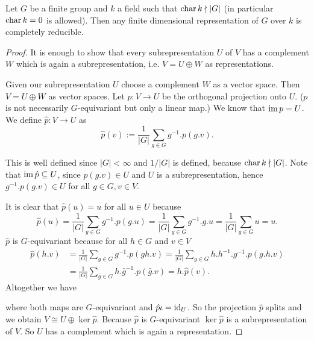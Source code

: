 \begin{thrm}
 Let $G$ be a finite group and $k$ a field such that $\operatorname{char} k \nmid |G|$ (in particular $\operatorname{char} k = 0$ is allowed). Then any finite dimensional representation of $G$ over $k$ is completely reducible.
\end{thrm}
\begin{proof}
 It is enough to show that every subrepresentation $U$ of $V$ has a complement $W$ which is again a subrepresentation, i.e. $V = U \oplus W$ as representations.
 
 Given our subrepresentation $U$ choose a complement $W$ as a vector space. Then $V = U \oplus W$ as vector spaces. Let $p : V \to U$ be the orthogonal projection onto $U$. ($p$ is not necessarily $G$-equivariant but only a linear map.) We know that $\operatorname{im} p = U$. We define $\hat{p} : V \to U$ as
 \[
  \hat{p}(v) := \frac{1}{|G|} \sum_{g \in G} g^{-1}.p(g.v).
 \]

This is well defined since $|G| < \infty$ and $1/|G|$ is defined, because $\operatorname{char} k \nmid |G|$. Note that $\operatorname{im} \hat{p} \subseteq U$, since $p(g.v) \in U$ and $U$ is a subrepresentation, hence $g^{-1}.p(g.v) \in U$ for all $g \in G, v \in V$.

It is clear that $\hat{p}(u) = u$ for all $u \in U$ because
\[
 \hat{p}(u)
 = \frac{1}{|G|} \sum_{g \in G} g^{-1}.p(g.u)
 = \frac{1}{|G|} \sum_{g \in G} g^{-1}.g.u
 = \frac{1}{|G|} \sum_{g \in G} u
 = u.
\]
$\hat{p}$ is $G$-equivariant because for all $h \in G$ and $v \in V$
\begin{align*}
 \hat{p}(h.v)
 &= \frac{1}{|G|} \sum_{g \in G} g^{-1}.p(gh.v)
 = \frac{1}{|G|} \sum_{g \in G} h.h^{-1}.g^{-1}.p(g.h.v) \\
 &= \frac{1}{|G|} \sum_{\bar{g} \in G} h.\bar{g}^{-1}.p(\bar{g}.v)
 = h.\hat{p}(v).
\end{align*}
Altogether we have
\begin{center}
\end{center}
where both maps are $G$-equivariant and $\hat{p} \iota = \operatorname{id}_U$. So the projection $\hat{p}$ splits and we obtain $V \cong U \oplus \ker \hat{p}$. Because $\hat{p}$ is $G$-equivariant $\ker \hat{p}$ is a subrepresentation of $V$. So $U$ has a complement which is again a representation.
\end{proof}

